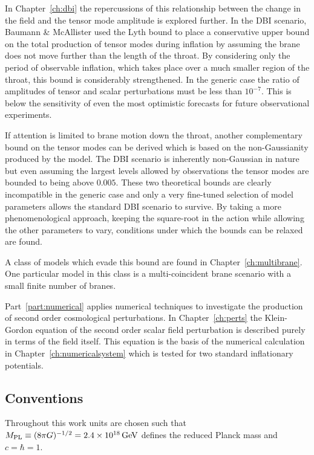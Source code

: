 In Chapter~\ref{ch:dbi} the repercussions of this relationship between the change in
the field and the tensor mode amplitude is explored further. In the DBI scenario,
Baumann \& McAllister \cite{bmpaper} used the Lyth bound to place a conservative
upper bound on the total production of tensor modes during inflation by assuming the
brane does not move further than the length of the throat. By considering only the
period of observable inflation, which takes place over a much smaller region of the
throat, this bound is considerably strengthened. In the generic case the ratio
of amplitudes of tensor and scalar perturbations must be less than $10^{-7}$. This
is below the sensitivity of even the most optimistic forecasts for future
observational experiments. 

If attention is limited to brane motion down the throat, another complementary bound
on the tensor modes can be derived which is based on the non-Gaussianity produced
by the model. The DBI scenario is inherently non-Gaussian in nature but even assuming
the largest levels allowed by observations the tensor modes are bounded to being
above $0.005$. These two theoretical bounds are clearly incompatible in the generic
case and only a very fine-tuned selection of model parameters allows the standard
DBI scenario to survive. By taking a more phenomenological approach, keeping
the square-root in the action while allowing the other parameters to vary,
conditions under which the bounds can be relaxed are found.


A class of models which evade this bound are found in
Chapter~\ref{ch:multibrane}. One particular model in this class is a
multi-coincident brane scenario with a small finite number of branes.


Part~\ref{part:numerical} applies numerical techniques to investigate the
production of second order cosmological perturbations. In
Chapter~\ref{ch:perts} the Klein-Gordon equation of the second order
scalar field perturbation is described purely in terms of the field itself.
This equation is the basis of the numerical calculation in
Chapter~\ref{ch:numericalsystem} which is tested for two standard inflationary
potentials. 



\subsection*{Conventions}
\label{sec:conventions}
Throughout this work units are chosen such that $M_{\mathrm{PL}} \equiv (8\pi G )^{-1/2}=
2.4 \times 10^{18}\, {\rm GeV}$ defines the reduced Planck mass and $c=\hbar =1$. 


